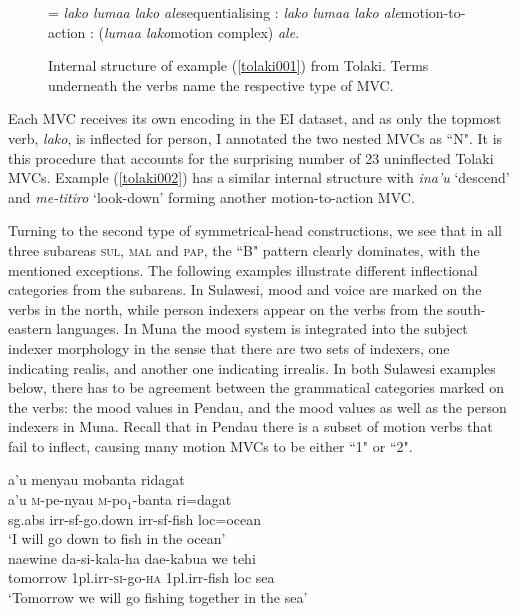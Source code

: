 \begin{figure}[h]


\jtree[xunit=8em,yunit=1em]
\! = {\textit{lako lumaa lako ale}}{sequentialising}
: {\textit{lako}} {\textit{lumaa lako ale}}{motion-to-action}
: ({\textit{lumaa lako}}{motion complex}) {\textit{ale}}.
\endjtree


\caption[Internal structure of example (\ref{tolaki001}) from Tolaki]{Internal structure of example (\ref{tolaki001}) from Tolaki. Terms underneath the verbs name the respective type of MVC.}
\label{figure:tolakiMVC}
\end{figure}


Each MVC receives its own encoding in the EI dataset, and as only the topmost verb, \textit{lako}, is inflected for person, I annotated the two nested MVCs as ``N". It is this procedure that accounts for the surprising number of 23 uninflected Tolaki MVCs. Example (\ref{tolaki002}) has a similar internal structure with \textit{ina'u} `descend' and \textit{me-titiro} `look-down' forming another motion-to-action MVC.

Turning to the second type of symmetrical-head constructions, we see that in all three subareas \textsc{sul}, \textsc{mal} and \textsc{pap}, the ``B" pattern clearly dominates, with the mentioned exceptions. The following examples illustrate different inflectional categories from the subareas. In Sulawesi, mood and voice are marked on the verbs in the north, while person indexers appear on the verbs from the south-eastern languages. In Muna the mood system is integrated into the subject indexer morphology in the sense that there are two sets of indexers, one indicating realis, and another one indicating irrealis. In both Sulawesi examples below, there has to be agreement between the grammatical categories marked on the verbs: the mood values in Pendau, and the mood values as well as the person indexers in Muna. Recall that in Pendau there is a subset of motion verbs that fail to inflect, causing many motion MVCs to be either ``1" or ``2".

\ea \label{}
\gll a'u menyau mobanta ridagat \\
a'u \textsc{m}-pe-nyau \textsc{m}-po$_1$-banta ri=dagat \\
\acs{sg}.\acs{abs} \acs{irr}-\acs{sf}-go.down \acs{irr}-\acs{sf}-fish \acs{loc}=ocean \\
\glft `I will go down to fish in the ocean' \\ 
\z
\xe
\ea \label{}
\gll naewine da-si-kala-ha dae-kabua we tehi \\
tomorrow 1\acs{pl}.\acs{irr}-\textsc{si}-go-\textsc{ha} 1\acs{pl}.\acs{irr}-fish \acs{loc} sea \\
\glft `Tomorrow we will go fishing together in the sea' \\ 
\z
\xe

